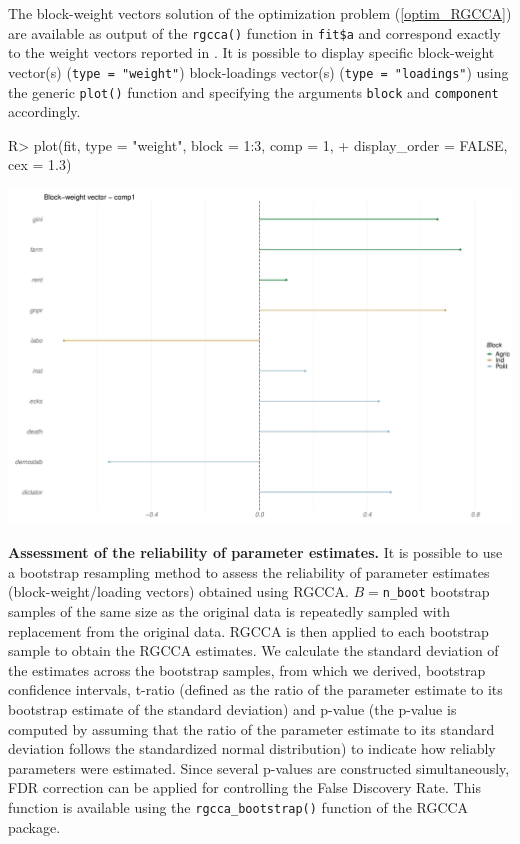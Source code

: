 \documentclass[
]{jss}
\begin{document}
\normalsize

The block-weight vectors solution of the optimization problem
(\ref{optim_RGCCA}) are available as output of the \texttt{rgcca()}
function in \texttt{fit\$a} and correspond exactly to the weight vectors
reported in \citep[see Figure 5]{Tenenhaus2011}. It is possible to
display specific block-weight vector(s) (\texttt{type\ =\ "weight"})
block-loadings vector(s) (\texttt{type\ =\ "loadings"}) using the
generic \texttt{plot()} function and specifying the arguments
\texttt{block} and \texttt{component} accordingly.

\footnotesize

\begin{CodeChunk}
\begin{CodeInput}
R> plot(fit, type = "weight", block = 1:3, comp = 1, 
+      display_order = FALSE, cex = 1.3)
\end{CodeInput}


\begin{center}\includegraphics{RGCCA_files/figure-latex/unnamed-chunk-7-1} \end{center}

\end{CodeChunk}

\normalsize

\textbf{Assessment of the reliability of parameter estimates.} It is
possible to use a bootstrap resampling method to assess the reliability
of parameter estimates (block-weight/loading vectors) obtained using
RGCCA. \(B=\)\texttt{n\_boot} bootstrap samples of the same size as the
original data is repeatedly sampled with replacement from the original
data. RGCCA is then applied to each bootstrap sample to obtain the RGCCA
estimates. We calculate the standard deviation of the estimates across
the bootstrap samples, from which we derived, bootstrap confidence
intervals, t-ratio (defined as the ratio of the parameter estimate to
its bootstrap estimate of the standard deviation) and p-value (the
p-value is computed by assuming that the ratio of the parameter estimate
to its standard deviation follows the standardized normal distribution)
to indicate how reliably parameters were estimated. Since several
p-values are constructed simultaneously, FDR correction can be applied
for controlling the False Discovery Rate. This function is available
using the \texttt{rgcca\_bootstrap()} function of the RGCCA package.
\end{document}
